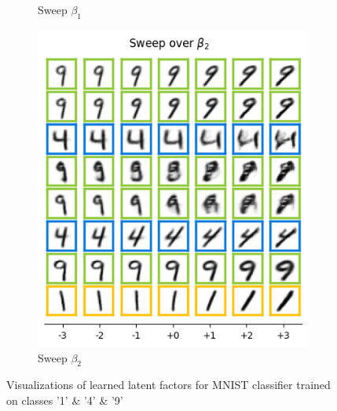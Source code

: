 \begin{figure}[h]
\begin{subfigure}[t]{.23\linewidth}
        \caption{Sweep $\beta_1$}
    \end{subfigure}
    \begin{subfigure}[t]{.23\linewidth}
        \includegraphics[width=.9\textwidth]{../openreview/pictures/Figure13/beta_2.png}
        \caption{Sweep $\beta_2$}
    \end{subfigure}
       
    \caption{Visualizations of learned latent factors for MNIST classifier trained on classes '1' \& '4' \& '9'}
    \label{fig:mnist_results 149 complete}
\end{figure}

